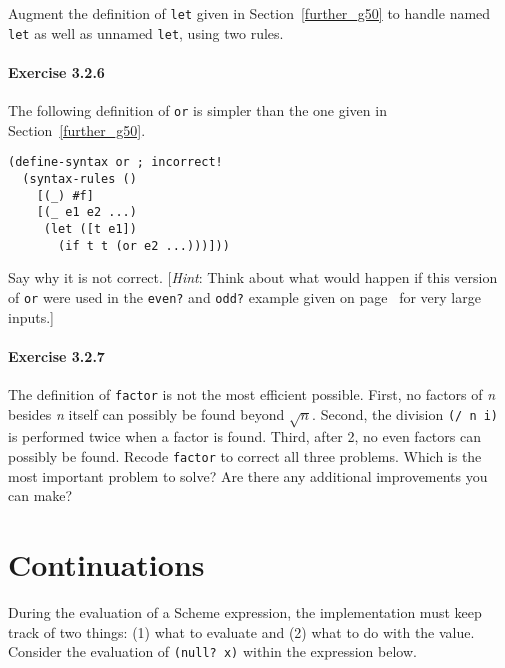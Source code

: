 \label{further_s57}Augment the definition of \texttt{let} given in Section \ref{further_g50} to
handle named \texttt{let} as well as unnamed \texttt{let}, using two rules.




\paragraph{Exercise \label{further_g61}3.2.6}


\label{further_s58}\label{further_ex_incorrect_or}The following definition of \texttt{or} is simpler than the one given
in Section \ref{further_g50}.


\begin{alltt}
(define-syntax or ; incorrect!
  (syntax-rules ()
    [(\_{}) \#{}f]
    [(\_{} e1 e2 ...)
     (let ([t e1])
       (if t t (or e2 ...)))]))
\end{alltt}


Say why it is not correct.
[\textit{Hint}: Think about what would happen if this version of \texttt{or}
were used in the \texttt{even?} and \texttt{odd?} example given
on page \pageref{further_defn_even__odd_} for very large inputs.]




\paragraph{Exercise \label{further_g62}3.2.7}


\label{further_s59}The definition of \label{further_s60}\texttt{factor} is not the most efficient possible.
First, no factors of \textit{n} besides \textit{n} itself can possibly be found
beyond \(\sqrt{n}\).
Second, the division \texttt{(/ n i)} is performed twice when a factor is
found.
Third, after 2, no even factors can possibly be found.
Recode \texttt{factor} to correct all three problems.
Which is the most important problem to solve?
Are there any additional improvements you can make?




\section{\label{further_g63}\label{further_h3}Continuations\label{further_SECTGFCONTINUATIONS}}



\label{further_s61}During the evaluation of a Scheme expression, the
implementation must keep track of two things:
(1) what to evaluate and (2) what to do with the value.
Consider the evaluation of \texttt{(null? x)} within the expression
below.


